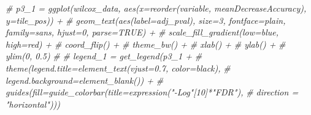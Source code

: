 \documentclass[
  11pt,
  oneside]{book}
\newenvironment{Shaded}{\begin{snugshade}}{\end{snugshade}}
\newcommand{\CommentTok}[1]{\textcolor[rgb]{0.56,0.35,0.01}{\textit{#1}}}
\begin{document}
\begin{Shaded}
\begin{Highlighting}[]
\CommentTok{\# p3\_1 = ggplot(wilcox\_data, aes(x=reorder(variable, meanDecreaseAccuracy), y=tile\_pos)) +}
\CommentTok{\#   geom\_text(aes(label=adj\_pval), size=3, fontface=\textquotesingle{}plain\textquotesingle{}, family=\textquotesingle{}sans\textquotesingle{}, hjust=0, parse=TRUE) +}
\CommentTok{\#   scale\_fill\_gradient(low=\textquotesingle{}blue\textquotesingle{}, high=\textquotesingle{}red\textquotesingle{}) +}
\CommentTok{\#   coord\_flip() +}
\CommentTok{\#   theme\_bw() +}
\CommentTok{\#   xlab(\textquotesingle{}\textquotesingle{}) +}
\CommentTok{\#   ylab(\textquotesingle{}\textquotesingle{}) +}
\CommentTok{\#   ylim(0, 0.5)}
\CommentTok{\#}
\CommentTok{\# legend\_1 = get\_legend(p3\_1 +}
\CommentTok{\#                         theme(legend.title=element\_text(vjust=0.7, color=\textquotesingle{}black\textquotesingle{}),}
\CommentTok{\#                               legend.background=element\_blank()) +}
\CommentTok{\#                         guides(fill=guide\_colorbar(title=expression("{-}Log"[10]*"FDR"),}
\CommentTok{\#                                                    direction = "horizontal")))}


\end{Highlighting}
\end{Shaded}
\end{document}

